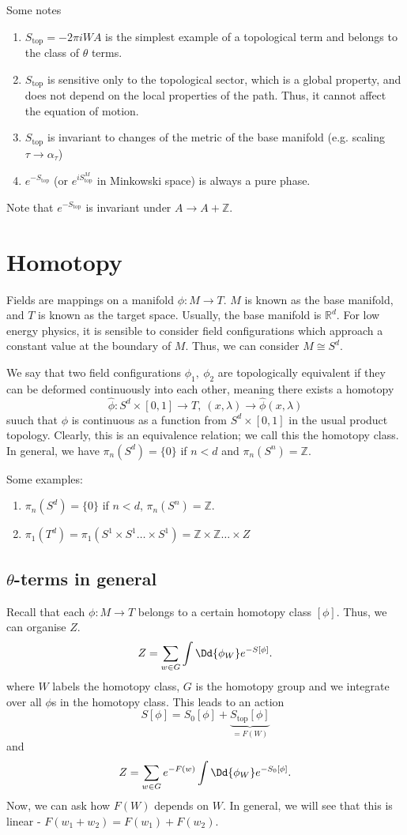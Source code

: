 \documentclass[twoside,symmetric, openany, 12pt]{./tuftebook}
\theoremstyle{definition}
\theoremstyle{definition}
\theoremstyle{definition}
\newcommand{\R}{\mathbb{R}}
\newcommand{\Z}{\mathbb{Z}}
\begin{document}
Some notes
\begin{enumerate}
	\item $S_\text{top}=-2\pi i W A$ is the simplest example of a topological term and belongs to the class of $\theta$ terms.
	\item $S_\text{top}$ is sensitive only to the topological sector, which is a global property, and does not depend on the local properties of the path. Thus, it cannot affect the equation of motion.
	\item $S_\text{top}$ is invariant to changes of the metric of the base manifold (e.g. scaling $\tau \to \alpha_\tau$)
	\item $e^{-S_\text{top}}$ (or $e^{i S_\text{top}^M}$ in Minkowski space) is always a pure phase. 
\end{enumerate}
Note that $e^{-S_\text{top}}$ is invariant under $A\to A+\Z$.
\section{Homotopy}
Fields are mappings on a manifold $\phi: M \to T$. $M$ is known as the base manifold, and $T$ is known as the target space. Usually, the base manifold is $\R^d$. For low energy physics, it is sensible to consider field configurations which approach a constant value at the boundary of $M$. Thus, we can consider $M\cong S^d$. 

We say that two field configurations $\phi_1,~\phi_2$ are topologically equivalent if they can be deformed continuously into each other, meaning there exists a homotopy
\[
	\hat{\phi}: S^d \times [0,1]\to T,~(x,\lambda) \to \hat{\phi}(x,\lambda)
\]
suuch that $\phi$ is continuous as a function from $S^d\times [0,1]$ in the usual product topology. Clearly, this is an equivalence relation; we call this the homotopy class. In general, we have $\pi_n(S^d)=\{0\} $ if $n<d$ and $\pi_n(S^n)=\Z$.

Some examples:
\begin{enumerate}
	\item $\pi_n(S^d)=\{0\} $ if $n<d$, $\pi_n(S^n) = \Z$.
	\item $\pi_1(T^d) = \pi_1(S^1\times S^1 \dots \times S^1) = \Z \times \Z \dots \times Z$
\end{enumerate}
\subsection{$\theta$-terms in general}
Recall that each $\phi: M\to T$ belongs to a certain homotopy class $[\phi]$. Thus, we can organise $Z$.
\[
	Z = \sum_{w\in G} \int \Dd{\phi_W} e^{-S[\phi]}
.\] 
where $W$ labels the homotopy class, $G$ is the homotopy group and we integrate over all $\phi$s in the homotopy class. This leads to an action
\[
	S[\phi] = S_0[\phi]+\underbrace{S_\text{top}[\phi]}_{=F(W)}
\]
and
\[
	Z = \sum_{w\in G}e^{-F(w)} \int \Dd{\phi_W} e^{-S_0[\phi]}
.\] 
Now, we can ask how $F(W)$ depends on $W$. In general, we will see that this is linear - $F(w_1+w_2) = F(w_1)+F(w_2)$.
\end{document}

